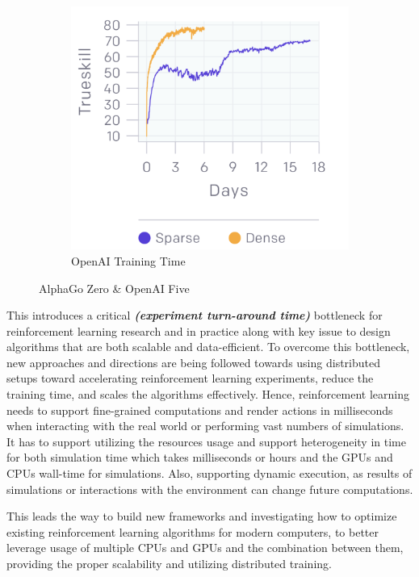 \begin{figure}[!htb]
\begin{subfigure}[b]{0.3\textwidth}
				\includegraphics[width=\textwidth]{figures/rl/openai_five_time.png}
				\caption{OpenAI Training Time}
				\label{fig:openai_five_time}
		\end{subfigure}
		\hfill
		 \caption{AlphaGo Zero \& OpenAI Five}
		 \label{fig:zero_and_five}
\end{figure}

This introduces a critical \textit{\textbf{(experiment turn-around time)}} bottleneck for reinforcement learning research and in practice along with key issue to design algorithms that are both scalable and data-efficient. To overcome this bottleneck, new approaches and directions are being followed towards using distributed setups toward accelerating reinforcement learning experiments, reduce the training time, and scales the algorithms effectively. Hence, reinforcement learning needs to support fine-grained computations and render actions in milliseconds when interacting with the real world or performing vast numbers of simulations. It has to support utilizing the resources usage and support heterogeneity in time for both simulation time which takes milliseconds or hours and the GPUs and CPUs wall-time for simulations. Also, supporting dynamic execution, as results of simulations or interactions with the environment can change future computations. 

This leads the way to build new frameworks and investigating how to optimize existing reinforcement learning algorithms for modern computers, to better leverage usage of multiple CPUs and GPUs and the combination between them, providing the proper scalability and utilizing distributed training.

